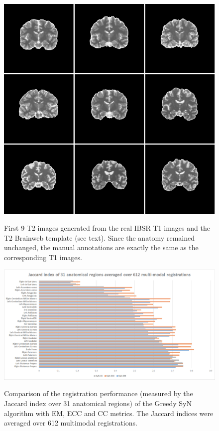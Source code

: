 \begin{figure}[H]
\centering
\includegraphics[width=1.0\linewidth]{./images/semi_synthetic.png}\\
\caption{First 9 T2 images generated from the real IBSR T1 images and the T2 Brainweb template (see text). Since the anatomy remained unchanged, the manual annotations are exactly
the same as the corresponding T1 images.}
\label{fig:semi_synthetic}
\end{figure}




\begin{figure}[H]
\centering
\includegraphics[width=1.0\linewidth]{./images/multi_graph_seg.png}\\
\caption{Comparison of the registration performance (measured by the Jaccard index over 31 anatomical regions) of the Greedy SyN algorithm with EM, ECC and CC metrics. The Jaccard
indices were averaged over 612 multimodal registrations.}
\label{fig:multi_graph_seg}
\end{figure}

